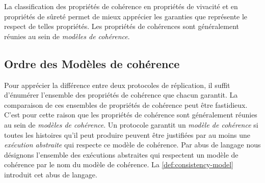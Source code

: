 

La classification des propriétés de cohérence en propriétés de vivacité et en propriétés de sûreté permet de mieux apprécier les garanties que représente le respect de telles propriétés.
Les propriétés de cohérences sont généralement réunies au sein de \emph{modèles de cohérence}.

\subsection{Ordre des Modèles de cohérence}\label{subsec:consistency-spec-hier}

Pour apprécier la différence entre deux protocoles de réplication, il suffit d'énumérer l'ensemble des propriétés de cohérence que chacun garantit.
La comparaison de ces ensembles de propriétés de cohérence peut être fastidieux.
C'est pour cette raison que les propriétés de cohérence sont généralement réunies au sein de \emph{modèles de cohérence}.
Un protocole garantit un \emph{modèle de cohérence} si toutes les histoires qu'il peut produire peuvent être justifiées par au moins une \emph{exécution abstraite} qui respecte ce modèle de cohérence.
Par abus de langage nous désignons l'ensemble des exécutions abstraites qui respectent un modèle de cohérence par le nom du modèle de cohérence.
La \autoref{def:consistency-model} introduit cet abus de langage.

